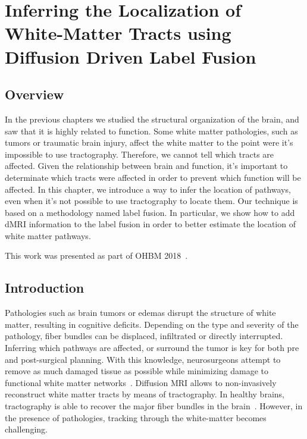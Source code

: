 \chapter{Inferring the Localization of White-Matter Tracts using Diffusion Driven Label Fusion}

\section{Overview}
In the previous chapters we studied the structural organization of the brain,
and saw that it is highly related to function. Some white matter pathologies,
such as tumors or traumatic brain injury, affect the white matter to the point
were it's impossible to use tractography. Therefore, we cannot tell which
tracts are affected. Given the relationship between brain and function, it's
important to determinate which tracts were affected in order to prevent
which function will be affected.
In this chapter, we introduce a way to infer the location of pathways, even
when it's not possible to use tractography to locate them. Our technique is
based on a methodology named label fusion. In particular, we show how to add
dMRI information to the label fusion in order to better estimate the location
of white matter pathways.

This work was presented as part of OHBM 2018~\cite{Guillermo2018}.

\section{Introduction}
%


Pathologies such as brain tumors or edemas disrupt the structure of white
matter, resulting in cognitive deficits. Depending on the type and severity
of the pathology, fiber bundles can be displaced, infiltrated or directly
interrupted. Inferring which pathways are affected, or surround the tumor
is key for both pre and post-surgical planning. With this knowledge, neurosurgeons
attempt to remove as much damaged tissue as possible while minimizing damage to
functional white matter networks~\cite{McGirt2009}. Diffusion MRI allows to
non-invasively reconstruct white matter tracts by means of tractography. In
healthy brains, tractography is able to recover the major fiber bundles in the
brain~\cite{Catani2008}. However, in the presence of pathologies, tracking
through the white-matter becomes challenging.

